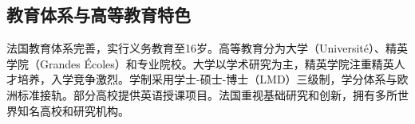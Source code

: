 \subsection{教育体系与高等教育特色}

法国教育体系完善，实行义务教育至16岁。高等教育分为大学（Université）、精英学院（Grandes Écoles）和专业院校。大学以学术研究为主，精英学院注重精英人才培养，入学竞争激烈。学制采用学士-硕士-博士（LMD）三级制，学分体系与欧洲标准接轨。部分高校提供英语授课项目。法国重视基础研究和创新，拥有多所世界知名高校和研究机构。
